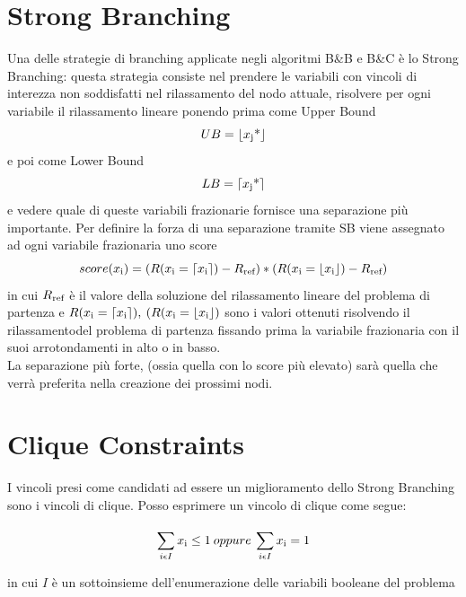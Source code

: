\documentclass[12pt,a4paper,twoside,openright]{book}
\begin{document}
\section{Strong Branching}
Una delle strategie di branching applicate negli algoritmi B\&B e B\&C è lo Strong Branching:
questa strategia consiste nel prendere le variabili con vincoli di interezza non soddisfatti
nel rilassamento del nodo attuale, risolvere per ogni variabile il rilassamento lineare
ponendo prima come Upper Bound \[UB = \lfloor x \textsubscript{j} \textup{*} \rfloor\] e poi come Lower Bound 
\[LB = \lceil x \textsubscript{j} \textup{*} \rceil\] e vedere quale di queste variabili frazionarie
fornisce una separazione più importante. Per definire la forza di una separazione tramite SB viene assegnato
ad ogni variabile frazionaria uno score 
\[score(x\textsubscript{i}) = 
(R(x\textsubscript{i} = \lceil x\textsubscript{i} \rceil)-R\textsubscript{ref})*(R(x\textsubscript{i} = \lfloor x\textsubscript{i} \rfloor) - R\textsubscript{ref})  \]
in cui $R\textsubscript{ref}$ è il valore della soluzione del rilassamento lineare del problema di partenza
e $R(x\textsubscript{i} = \lceil x\textsubscript{i} \rceil),\:(R(x\textsubscript{i} = \lfloor x\textsubscript{i} \rfloor) $ sono i valori ottenuti risolvendo
il rilassamentodel problema di partenza fissando prima la variabile frazionaria con il suoi arrotondamenti in alto
o in basso. \\La separazione più forte, (ossia quella con lo score più elevato) sarà quella che verrà preferita nella creazione dei prossimi nodi.

\section{Clique Constraints}
I vincoli presi come candidati ad essere un miglioramento dello Strong Branching sono i 
vincoli di clique. Posso esprimere un vincolo di clique come segue:

    \[ \sum\limits_{i \epsilon I}^{} x\textsubscript{i} \leq 1 \:  oppure \: \sum\limits_{i \epsilon I}^{} x\textsubscript{i} = 1 \]

in cui $I$ è un sottoinsieme dell'enumerazione delle
variabili booleane del problema
\end{document}
